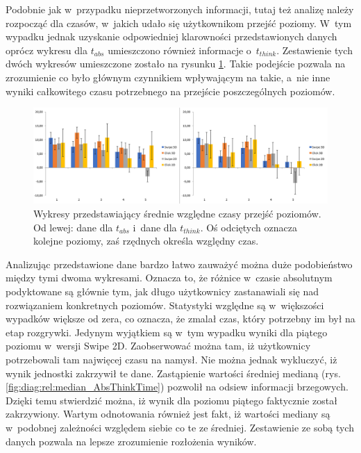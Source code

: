 \documentclass[a4paper,12pt,numbers=noenddot]{report}
\begin{document}
Podobnie jak w~przypadku nieprzetworzonych informacji, tutaj też analizę należy rozpocząć dla czasów, w~jakich udało się użytkownikom przejść poziomy. W~tym wypadku jednak uzyskanie odpowiedniej klarowności przedstawionych danych oprócz wykresu dla $t_{abs}$ umieszczono również informacje o~$t_{think}$. Zestawienie tych dwóch wykresów umieszczone zostało na rysunku \ref{fig:diag:rel:mean_AbsThinkTime}. Takie podejście pozwala na zrozumienie co było głównym czynnikiem wpływającym na takie, a~nie inne wyniki całkowitego czasu potrzebnego na przejście poszczególnych poziomów.

\begin{figure}[h!]
	\centering
  	\includegraphics[width=\linewidth]{diag/rel_mean_absThinkTime.png}
	\caption{Wykresy przedstawiający średnie względne czasy przejść poziomów. Od lewej: dane dla $t_{abs}$ i~dane dla $t_{think}$. Oś odciętych oznacza kolejne poziomy, zaś rzędnych określa względny czas.}
	\label{fig:diag:rel:mean_AbsThinkTime}
\end{figure}

Analizując przedstawione dane bardzo łatwo zauważyć można duże podobieństwo między tymi dwoma wykresami. Oznacza to, że różnice w~czasie absolutnym podyktowane są głównie tym, jak długo użytkownicy zastanawiali się nad rozwiązaniem konkretnych poziomów. Statystyki względne są w~większości wypadków większe od zera, co oznacza, że zmalał czas, który potrzebny im był na etap rozgrywki. Jedynym wyjątkiem są w~tym wypadku wyniki dla piątego poziomu w~wersji Swipe 2D. Zaobserwować można tam, iż użytkownicy potrzebowali tam najwięcej czasu na namysł. Nie można jednak wykluczyć, iż wynik jednostki zakrzywił te dane. Zastąpienie wartości średniej medianą (rys. \ref{fig:diag:rel:median_AbsThinkTime}) pozwolił na odsiew informacji brzegowych. Dzięki temu stwierdzić można, iż wynik dla poziomu piątego faktycznie został zakrzywiony. Wartym odnotowania również jest fakt, iż wartości mediany są w~podobnej zależności względem siebie co te ze średniej. Zestawienie ze sobą tych danych pozwala na lepsze zrozumienie rozłożenia wyników.
\end{document}
